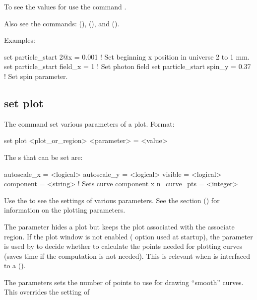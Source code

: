 {{To see the values for  use the command .

Also see the commands:  (),  (), 
and  ().

Examples:
\begin{example}
  set particle_start 2@x = 0.001         ! Set beginning x position in universe 2 to 1 mm.
  set particle_start field_x = 1         ! Set photon field
  set particle_start spin_y = 0.37       ! Set spin parameter.
\end{example}


\subsection{set plot}
\label{s:set.plot}

The  command set various parameters of a plot. Format:
\begin{example}
  set plot <plot_or_region> <parameter> = <value>
\end{example}

The s that can be set are:
\begin{example}
  autoscale_x        = <logical>
  autoscale_y        = <logical>
  visible            = <logical>
  component          = <string>    ! Sets curve component 
  x%
  n_curve_pts        = <integer>
\end{example}
Use the  to see the settings of various parameters. See the  section () for information on the plotting parameters.

The  parameter hides a plot but keeps the plot associated with the associate region. If
the plot window is not enabled ( option used at startup), the  parameter is
used by \tao to decide whether to calculate the points needed for plotting curves (saves time if the
computation is not needed). This is relevant when \tao is interfaced to a 
().

The  parameters sets the number of points to use for drawing ``smooth'' curves. This
overrides the setting of \vn{plot_page%
intermediate calculations used to compute a smooth curve to use in the computation of other smooth
curves. \tao will only do this for curves that have \vn{plot_page%
points. Depending upon the circumstances, setting \vn{plot%
slow down plotting calculations significantly.

}}}}}
